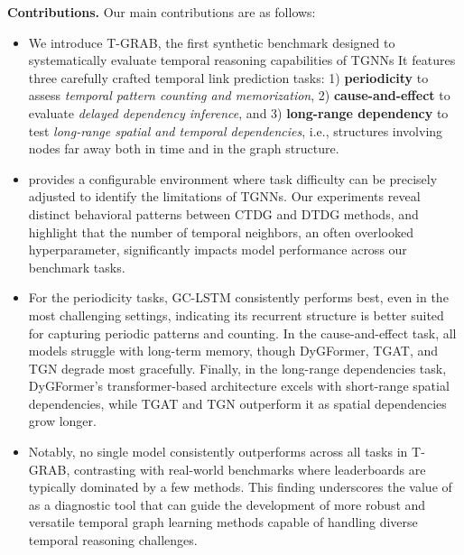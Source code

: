 \textbf{Contributions.} Our main contributions are as follows:
\begin{itemize} 
    \item We introduce T-GRAB, the first synthetic benchmark designed to systematically evaluate temporal reasoning capabilities of TGNNs  It features three carefully crafted temporal link prediction tasks: 1) \textbf{periodicity} to assess \textit{temporal pattern counting and memorization}, 2) \textbf{cause-and-effect} to evaluate \textit{delayed dependency inference}, and 3) \textbf{long-range dependency} to test \textit{long-range spatial and temporal dependencies}, i.e., structures involving nodes far away both in time and in the graph structure.
    
    \item \benchmarkname provides a configurable environment where task difficulty can be precisely adjusted to identify the limitations of TGNNs. Our experiments reveal distinct behavioral patterns between CTDG and DTDG methods, and highlight that the number of temporal neighbors, an often overlooked hyperparameter, significantly impacts model performance across our benchmark tasks.
    
     \item For the periodicity tasks, GC-LSTM consistently performs best, even in the most challenging settings, indicating its recurrent structure is better suited for capturing periodic patterns and counting. In the cause-and-effect task, all models struggle with long-term memory, though DyGFormer, TGAT, and TGN degrade most gracefully. Finally, in the long-range dependencies task, DyGFormer's transformer-based architecture excels with short-range spatial dependencies, while TGAT and TGN outperform it as spatial dependencies grow longer.

    
    \item Notably, no single model consistently outperforms across all tasks in T-GRAB, contrasting with real-world benchmarks where leaderboards are typically dominated by a few methods. This finding underscores the value of \benchmarkname as a diagnostic tool that can guide the development of more robust and versatile temporal graph learning methods capable of handling diverse temporal reasoning challenges.
\end{itemize}